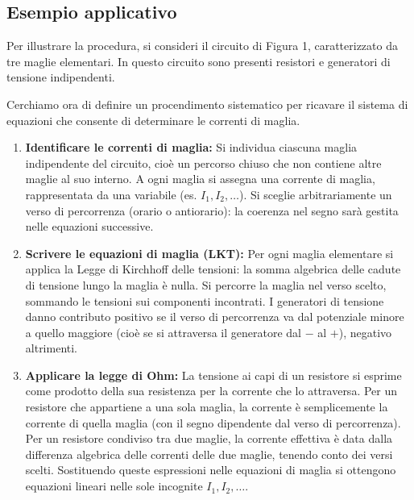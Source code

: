 \subsection*{\Large{Esempio applicativo}}


Per illustrare la procedura, si consideri il circuito di Figura 1, caratterizzato da tre maglie elementari. In questo circuito sono presenti resistori e generatori di tensione indipendenti.



Cerchiamo ora di definire un procendimento sistematico per ricavare il sistema di equazioni che consente di determinare le correnti di maglia.

\begin{enumerate}
    \item \textbf{Identificare le correnti di maglia:} 
    Si individua ciascuna maglia indipendente del circuito, cioè un percorso chiuso che non contiene altre maglie al suo interno. A ogni maglia si assegna una corrente di maglia, rappresentata da una variabile (es. $I_1, I_2, \dots$). Si sceglie arbitrariamente un verso di percorrenza (orario o antiorario): la coerenza nel segno sarà gestita nelle equazioni successive.

    \item \textbf{Scrivere le equazioni di maglia (LKT):} 
    Per ogni maglia elementare si applica la Legge di Kirchhoff delle tensioni: la somma algebrica delle cadute di tensione lungo la maglia è nulla. Si percorre la maglia nel verso scelto, sommando le tensioni sui componenti incontrati. I generatori di tensione danno contributo positivo se il verso di percorrenza va dal potenziale minore a quello maggiore (cioè se si attraversa il generatore dal $-$ al $+$), negativo altrimenti.

    \item \textbf{Applicare la legge di Ohm:} 
    La tensione ai capi di un resistore si esprime come prodotto della sua resistenza per la corrente che lo attraversa. Per un resistore che appartiene a una sola maglia, la corrente è semplicemente la corrente di quella maglia (con il segno dipendente dal verso di percorrenza). Per un resistore condiviso tra due maglie, la corrente effettiva è data dalla differenza algebrica delle correnti delle due maglie, tenendo conto dei versi scelti. Sostituendo queste espressioni nelle equazioni di maglia si ottengono equazioni lineari nelle sole incognite $I_1, I_2, \dots$.


\end{enumerate}
